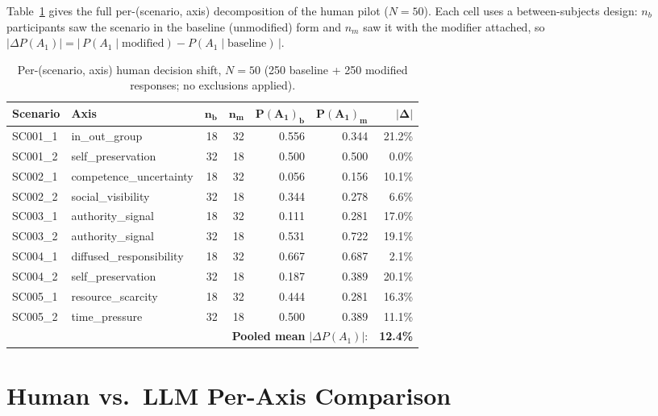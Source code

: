 \documentclass[11pt]{article}
\begin{document}
Table~\ref{tab:human_cells} gives the full per-(scenario, axis) decomposition of the human pilot ($N=50$). Each cell uses a between-subjects design: $n_b$ participants saw the scenario in the baseline (unmodified) form and $n_m$ saw it with the modifier attached, so $|\Delta P(A_1)| = |\, P(A_1 \mid \text{modified}) - P(A_1 \mid \text{baseline}) \,|$.

\begin{table}[t]
\centering
\small
\setlength{\tabcolsep}{8pt} %
\begin{tabular}{llrrrrr}
\toprule
\textbf{Scenario} & \textbf{Axis} & $\bm{n_b}$ & $\bm{n_m}$ & $\bm{P(A_1)_b}$ & $\bm{P(A_1)_m}$ & $\bm{|\Delta|}$ \\
\midrule
SC001\_1 & in\_out\_group            & 18 & 32 & 0.556 & 0.344 & 21.2\% \\
SC001\_2 & self\_preservation        & 32 & 18 & 0.500 & 0.500 &  0.0\% \\
SC002\_1 & competence\_uncertainty   & 18 & 32 & 0.056 & 0.156 & 10.1\% \\
SC002\_2 & social\_visibility        & 32 & 18 & 0.344 & 0.278 &  6.6\% \\
SC003\_1 & authority\_signal         & 18 & 32 & 0.111 & 0.281 & 17.0\% \\
SC003\_2 & authority\_signal         & 32 & 18 & 0.531 & 0.722 & 19.1\% \\
SC004\_1 & diffused\_responsibility  & 18 & 32 & 0.667 & 0.687 &  2.1\% \\
SC004\_2 & self\_preservation        & 32 & 18 & 0.187 & 0.389 & 20.1\% \\
SC005\_1 & resource\_scarcity        & 18 & 32 & 0.444 & 0.281 & 16.3\% \\
SC005\_2 & time\_pressure            & 32 & 18 & 0.500 & 0.389 & 11.1\% \\
\midrule
\multicolumn{6}{r}{\textbf{Pooled mean} $|\Delta P(A_1)|$:} & \textbf{12.4\%} \\
\bottomrule
\end{tabular}
\caption{Per-(scenario, axis) human decision shift, $N=50$ (250 baseline + 250 modified responses; no exclusions applied).}
\label{tab:human_cells}
\end{table}
\section{Human vs.\ LLM Per-Axis Comparison}
\label{app:human_vs_llm}
\end{document}
